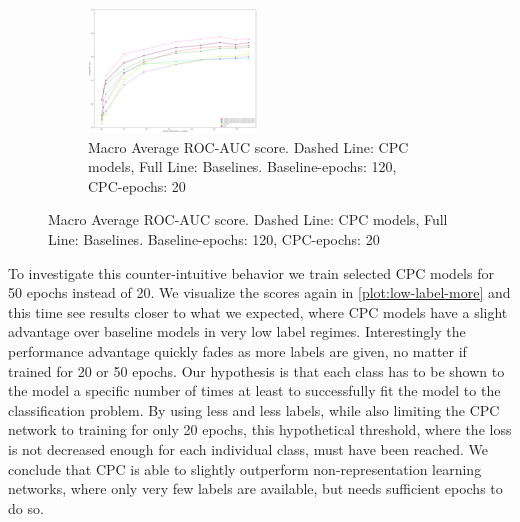 \begin{figure}
	\begin{subfigure}[t]{0.99\textwidth}\centering
		\includegraphics[width=1\linewidth]{bilder/2lowlabel-macro-20.png}%
		\caption{Macro Average ROC-AUC score. Dashed Line: CPC models, Full Line: Baselines. Baseline-epochs: 120, CPC-epochs: 20}
		\label{fig:low-label-macro}	
	\end{subfigure}
	\label{plot:low-label}
\end{figure}

To investigate this counter-intuitive behavior we train selected CPC models for 50 epochs instead of 20. We visualize the scores again in \autoref{plot:low-label-more} and this time see results closer to what we expected, where CPC models have a slight advantage over baseline models in very low label regimes. Interestingly the performance advantage quickly fades as more labels are given, no matter if trained for 20 or 50 epochs. Our hypothesis is that each class has to be shown to the model a specific number of times at least to successfully fit the model to the classification problem. By using less and less labels, while also limiting the CPC network to training for only 20 epochs, this hypothetical threshold, where the loss is not decreased enough for each individual class, must have been reached. We conclude that CPC is able to slightly outperform non-representation learning networks, where only very few labels are available, but needs sufficient epochs to do so. 


